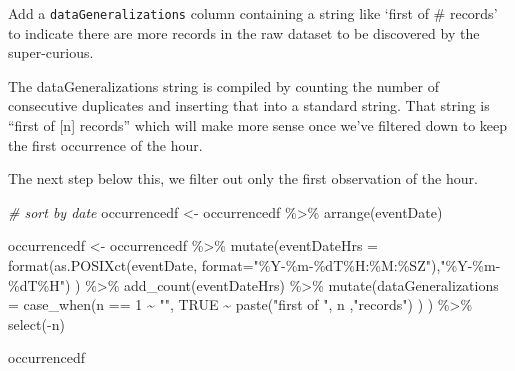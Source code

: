 \documentclass[
]{book}
\newenvironment{Shaded}{\begin{snugshade}}{\end{snugshade}}
\newcommand{\AttributeTok}[1]{\textcolor[rgb]{0.77,0.63,0.00}{#1}}
\newcommand{\CommentTok}[1]{\textcolor[rgb]{0.56,0.35,0.01}{\textit{#1}}}
\newcommand{\ConstantTok}[1]{\textcolor[rgb]{0.00,0.00,0.00}{#1}}
\newcommand{\DecValTok}[1]{\textcolor[rgb]{0.00,0.00,0.81}{#1}}
\newcommand{\FunctionTok}[1]{\textcolor[rgb]{0.00,0.00,0.00}{#1}}
\newcommand{\NormalTok}[1]{#1}
\newcommand{\OtherTok}[1]{\textcolor[rgb]{0.56,0.35,0.01}{#1}}
\newcommand{\SpecialCharTok}[1]{\textcolor[rgb]{0.00,0.00,0.00}{#1}}
\newcommand{\StringTok}[1]{\textcolor[rgb]{0.31,0.60,0.02}{#1}}
\begin{document}
Add a \texttt{dataGeneralizations} column containing a string like `first of \# records' to indicate there are more records in the raw dataset to be discovered by the super-curious.

The dataGeneralizations string is compiled by counting the number of consecutive duplicates and inserting that into a standard string. That string is ``first of {[}n{]} records'' which will make more sense once we've filtered down to keep the first occurrence of the hour.

The next step below this, we filter out only the first observation of the hour.

\begin{Shaded}
\begin{Highlighting}[]
\CommentTok{\# sort by date}
\NormalTok{occurrencedf }\OtherTok{\textless{}{-}}\NormalTok{ occurrencedf }\SpecialCharTok{\%\textgreater{}\%} \FunctionTok{arrange}\NormalTok{(eventDate)}

\NormalTok{occurrencedf }\OtherTok{\textless{}{-}}\NormalTok{ occurrencedf }\SpecialCharTok{\%\textgreater{}\%}
    \FunctionTok{mutate}\NormalTok{(}\AttributeTok{eventDateHrs =} \FunctionTok{format}\NormalTok{(}\FunctionTok{as.POSIXct}\NormalTok{(eventDate, }\AttributeTok{format=}\StringTok{"\%Y{-}\%m{-}\%dT\%H:\%M:\%SZ"}\NormalTok{),}\StringTok{"\%Y{-}\%m{-}\%dT\%H"}\NormalTok{)}
\NormalTok{           ) }\SpecialCharTok{\%\textgreater{}\%}
    \FunctionTok{add\_count}\NormalTok{(eventDateHrs) }\SpecialCharTok{\%\textgreater{}\%}
    \FunctionTok{mutate}\NormalTok{(}\AttributeTok{dataGeneralizations =} \FunctionTok{case\_when}\NormalTok{(n }\SpecialCharTok{==} \DecValTok{1} \SpecialCharTok{\textasciitilde{}} \StringTok{""}\NormalTok{,}
                                           \ConstantTok{TRUE} \SpecialCharTok{\textasciitilde{}} \FunctionTok{paste}\NormalTok{(}\StringTok{"first of "}\NormalTok{, n ,}\StringTok{"records"}\NormalTok{)}
\NormalTok{                                           )}
\NormalTok{           ) }\SpecialCharTok{\%\textgreater{}\%}
    \FunctionTok{select}\NormalTok{(}\SpecialCharTok{{-}}\NormalTok{n)}

\NormalTok{occurrencedf}
\end{Highlighting}
\end{Shaded}
\end{document}
